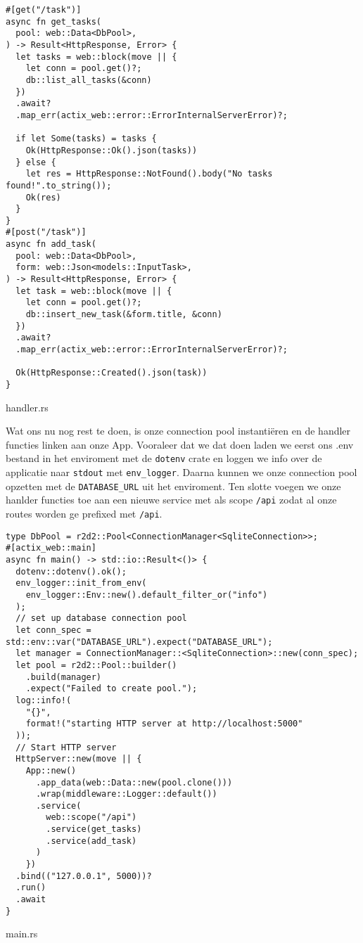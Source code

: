 \begin{listing}[h]
\begin{verbatim}
#[get("/task")]
async fn get_tasks(
  pool: web::Data<DbPool>,
) -> Result<HttpResponse, Error> {
  let tasks = web::block(move || {
    let conn = pool.get()?;
    db::list_all_tasks(&conn)
  })
  .await?
  .map_err(actix_web::error::ErrorInternalServerError)?;

  if let Some(tasks) = tasks {
    Ok(HttpResponse::Ok().json(tasks))
  } else {
    let res = HttpResponse::NotFound().body("No tasks found!".to_string());
    Ok(res)
  }
}
#[post("/task")]
async fn add_task(
  pool: web::Data<DbPool>,
  form: web::Json<models::InputTask>,
) -> Result<HttpResponse, Error> {
  let task = web::block(move || {
    let conn = pool.get()?;
    db::insert_new_task(&form.title, &conn)
  })
  .await?
  .map_err(actix_web::error::ErrorInternalServerError)?;

  Ok(HttpResponse::Created().json(task))
}
\end{verbatim}
\caption{handler.rs}
\end{listing}

\clearpage

Wat ons nu nog rest te doen, is onze connection pool instantiëren en de handler functies linken aan
onze App. Vooraleer dat we dat doen laden we eerst ons .env bestand in het enviroment met de
\texttt{dotenv} crate en loggen we info over de applicatie naar \texttt{stdout}
met \texttt{env_logger}. Daarna kunnen we onze connection pool opzetten met de
\texttt{DATABASE_URL} uit het enviroment. Ten slotte voegen we onze hanlder functies toe
aan een nieuwe service met als scope \texttt{/api} zodat al onze routes worden ge prefixed
met \texttt{/api}.

\begin{listing}[h]
\begin{verbatim}
type DbPool = r2d2::Pool<ConnectionManager<SqliteConnection>>;
#[actix_web::main]
async fn main() -> std::io::Result<()> {
  dotenv::dotenv().ok();
  env_logger::init_from_env(
    env_logger::Env::new().default_filter_or("info")
  );
  // set up database connection pool
  let conn_spec = std::env::var("DATABASE_URL").expect("DATABASE_URL");
  let manager = ConnectionManager::<SqliteConnection>::new(conn_spec);
  let pool = r2d2::Pool::builder()
    .build(manager)
    .expect("Failed to create pool.");
  log::info!(
    "{}",
    format!("starting HTTP server at http://localhost:5000"
  ));
  // Start HTTP server
  HttpServer::new(move || {
    App::new()
      .app_data(web::Data::new(pool.clone()))
      .wrap(middleware::Logger::default())
      .service(
        web::scope("/api")
        .service(get_tasks)
        .service(add_task)
      )
    })
  .bind(("127.0.0.1", 5000))?
  .run()
  .await
}
\end{verbatim}
\caption{main.rs}
\end{listing}


